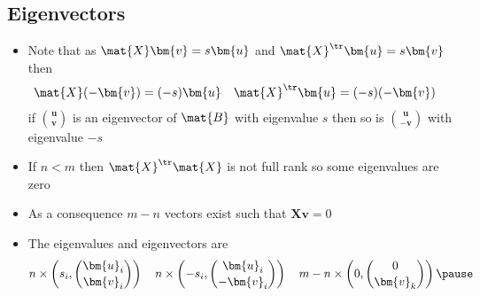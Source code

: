 \begin{slide}
\section[-1]{Eigenvectors}

\begin{PauseHighLight}
  \begin{itemize}
  \item Note that as $\mat{X} \bm{v} = s \bm{u}$ and $\mat{X}^\tr
    \bm{u} = s \bm{v}$ then
    \begin{align*}
      \mat{X} (-\bm{v}) &= (-s) \bm{u}& 
      \mat{X}^\tr \bm{u} &= (-s) (-\bm{v})
    \end{align*}
    if $\binom{\bm{u}}{\bm{v}}$ is an eigenvector of $\mat{B}$ with
    eigenvalue $s$ then so is $\binom{\bm{u}}{-\bm{v}}$ 
    with eigenvalue $-s$\pause
  \item If $n<m$ then $\mat{X}^\tr\mat{X}$ is not full rank so some
    eigenvalues are zero\pause
  \item As a consequence $m-n$ vectors exist such that
    $\bm{X}\bm{v}=0$\pause
  \item The eigenvalues and eigenvectors are
    \begin{align*}
      n\times\left(s_i, \binom{\bm{u}_i}{\bm{v}_i}\right) \quad
      n\times\left(-s_i, \binom{\bm{u}_i}{-\bm{v}_i}\right) \quad
      m-n\times\left(0, \binom{0}{\bm{v}_k}\right) \pause
    \end{align*}
  \end{itemize}
\end{PauseHighLight}

\end{slide}


